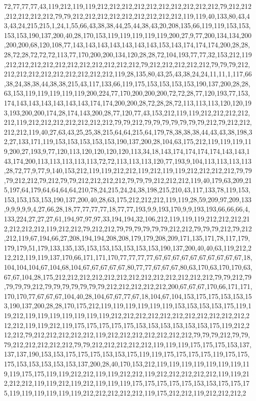 72,77,77,77,43,119,212,119,119,212,212,212,212,212,212,212,212,212,212,79,212,212,212,212,212,212,79,79,212,212,212,212,212,212,212,212,212,119,119,40,133,80,43,43,43,24,215,215,1,24,1,55,66,43,38,38,44,25,44,38,43,20,208,135,66,119,119,153,153,153,153,190,137,200,40,28,170,153,119,119,119,119,119,200,27,9,77,200,134,134,200,200,200,68,120,108,77,143,143,143,143,143,143,143,153,143,174,174,174,200,28,28,28,72,28,72,72,72,113,77,170,200,200,134,120,28,28,72,104,193,77,77,32,153,212,119,212,212,212,212,212,212,212,212,212,212,212,79,212,212,212,212,212,79,79,79,212,212,212,212,212,212,212,212,212,212,119,28,135,80,43,25,43,38,24,24,11,11,1,117,66,38,24,38,38,44,38,38,215,43,117,133,66,119,175,153,153,153,153,190,137,200,28,28,63,153,119,119,119,119,119,200,224,77,170,200,200,200,72,72,28,77,120,193,77,153,174,143,143,143,143,143,143,174,174,200,200,28,72,28,28,72,113,113,113,120,120,193,193,200,200,174,28,174,143,200,28,77,120,77,43,153,212,119,119,212,212,212,212,212,119,212,212,212,212,212,212,212,79,79,212,79,79,79,79,79,79,79,212,79,212,212,212,212,119,40,27,63,43,25,25,38,215,64,64,215,64,179,78,38,38,38,44,43,43,38,198,32,27,133,171,119,153,153,153,153,153,190,137,200,28,104,63,175,212,119,119,119,119,200,27,193,9,77,120,113,120,120,120,120,113,34,18,143,174,174,174,174,143,143,143,174,200,113,113,113,113,113,72,72,113,113,113,120,77,193,9,104,113,113,113,113,28,72,77,9,77,9,140,153,212,119,119,212,212,119,212,119,119,212,212,212,212,79,79,79,212,212,79,212,79,79,212,212,212,212,79,79,79,212,212,212,119,40,179,63,209,215,197,64,179,64,64,64,64,210,78,24,215,24,24,38,198,215,210,43,117,133,78,119,153,153,153,153,153,190,137,200,40,28,63,175,212,212,212,119,119,28,59,209,97,209,133,9,9,9,9,9,4,27,66,28,18,77,77,77,77,18,77,77,193,9,9,193,170,9,9,193,193,66,66,66,4,133,224,27,27,27,61,194,97,97,97,33,194,194,32,106,212,119,119,119,212,212,212,212,212,212,212,119,212,212,79,212,212,79,79,79,79,79,79,212,212,79,79,79,212,79,212,212,119,67,194,66,27,208,194,194,208,208,179,179,208,209,171,135,171,78,117,179,179,179,51,179,133,135,135,153,153,153,153,153,153,190,137,200,40,40,63,119,212,212,212,119,119,137,170,66,171,171,170,77,77,77,77,67,67,67,67,67,67,67,67,67,67,18,104,104,104,67,104,68,104,67,67,67,67,67,80,77,77,67,67,67,80,63,170,63,170,170,63,67,67,104,28,175,212,212,212,212,212,212,212,212,212,212,212,212,212,79,79,212,79,79,79,79,212,79,79,79,79,79,79,79,212,212,212,212,212,200,67,67,67,170,66,171,171,170,170,77,67,67,67,104,40,28,104,67,67,77,67,18,104,67,104,153,175,175,153,153,153,190,137,200,28,28,170,175,212,119,119,119,119,119,119,153,153,153,153,175,119,119,212,119,119,119,119,119,119,119,212,212,212,212,212,212,212,212,212,212,212,212,212,119,119,212,119,175,175,175,175,175,153,153,153,153,153,153,175,119,212,212,212,79,212,212,212,212,212,119,212,212,212,212,212,212,212,79,79,79,212,79,79,79,212,212,212,212,212,79,79,212,212,212,212,212,119,119,119,175,175,175,153,137,137,137,190,153,153,175,175,175,153,153,175,119,119,175,175,175,175,119,175,175,175,153,153,153,153,153,137,200,28,40,170,153,212,119,119,119,119,119,119,119,119,119,175,175,119,119,212,212,119,119,212,212,119,212,212,212,212,212,119,119,212,212,212,119,119,212,119,212,119,119,119,175,175,175,175,175,153,153,175,175,175,119,119,119,119,119,119,212,212,212,212,212,119,175,212,212,119,212,212,212,2